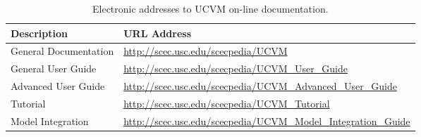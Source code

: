 
\begin{table*}[t]
\centering
\small
\caption{Electronic addresses to UCVM on-line documentation.}
\begin{tabular}[]{ll}
\\
Description                 & URL Address                                                         \\
\hline
General Documentation       & \url{http://scec.usc.edu/scecpedia/UCVM}                            \\
General User Guide          & \url{http://scec.usc.edu/scecpedia/UCVM_User_Guide}                 \\
Advanced User Guide 	    & \url{http://scec.usc.edu/scecpedia/UCVM_Advanced_User_Guide} 	  \\
Tutorial 	            & \url{http://scec.usc.edu/scecpedia/UCVM_Tutorial}            	  \\
Model Integration           & \url{http://scec.usc.edu/scecpedia/UCVM_Model_Integration_Guide}    \\
\hline
\end{tabular}
\label{tab:manuals}
\end{table*}
